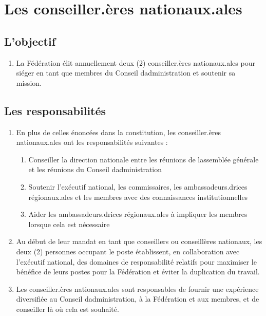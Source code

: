 \section{Les conseiller.ères nationaux.ales}
\label{les-conseiller-eres-nationaux-ales}

\subsection{L'objectif}
\label{lobjectif-1}

\begin{enumerate}
 \item
  La Fédération élit annuellement deux (2) conseiller.ères nationaux.ales pour siéger en tant que membres du Conseil d\textquotesingle administration et soutenir sa mission.
\end{enumerate}

\subsection{Les responsabilités}
\label{les-responsabilites-2}

\begin{enumerate}
 \item
  En plus de celles énoncées dans la constitution, les conseiller.ères nationaux.ales ont les responsabilités suivantes :

  \begin{enumerate}
   \item
    Conseiller la direction nationale entre les réunions de l\textquotesingle assemblée générale et les réunions du Conseil d\textquotesingle administration
   \item
    Soutenir l'exécutif national, les commissaires, les ambassadeurs.drices régionaux.ales et les membres avec des connaissances institutionnelles
   \item
    Aider les ambassadeurs.drices régionaux.ales à impliquer les membres lorsque cela est nécessaire
  \end{enumerate}
 \item
  Au début de leur mandat en tant que conseillers ou conseillères nationaux, les deux (2) personnes occupant le poste établissent, en collaboration avec l'exécutif national, des domaines de responsabilité relatifs pour maximiser le bénéfice de leurs postes pour la Fédération et éviter la duplication du travail.
 \item
  Les conseiller.ères nationaux.ales sont responsables de fournir une expérience diversifiée au Conseil d\textquotesingle administration, à la Fédération et aux membres, et de conseiller là où cela est souhaité.
\end{enumerate}

